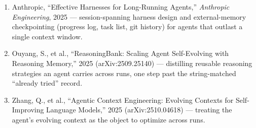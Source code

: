 \begin{small}
\begin{enumerate}
\item Anthropic, ``Effective Harnesses for Long-Running Agents,'' \emph{Anthropic Engineering}, 2025 — session-spanning harness design and external-memory checkpointing (progress log, task list, git history) for agents that outlast a single context window.
\item Ouyang, S., et al., ``ReasoningBank: Scaling Agent Self-Evolving with Reasoning Memory,'' 2025 (arXiv:2509.25140) — distilling reusable reasoning strategies an agent carries across runs, one step past the string-matched ``already tried'' record.
\item Zhang, Q., et al., ``Agentic Context Engineering: Evolving Contexts for Self-Improving Language Models,'' 2025 (arXiv:2510.04618) — treating the agent's evolving context as the object to optimize across runs.
\end{enumerate}
\end{small}
